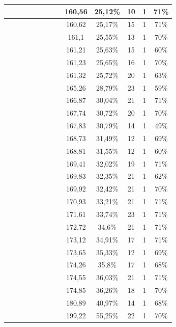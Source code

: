 \begin{center}
\begin{longtable}{|c|c|c|c|c|c|c|c|c|c|c|c|c|}
 \x &  &  &  &  \x &  \x &  \x &  \x & 160,56 & 25,12\% & 10 & 1 & 71\% \\ \hline
 \x &  \x &  \x &  \x &  \x &  \x &  \x &  & 160,62 & 25,17\% & 15 & 1 & 71\% \\ \hline
 \x &  &  \x &  \x &  \x &  \x &  \x &  & 161,1 & 25,55\% & 13 & 1 & 70\% \\ \hline
 \x &  &  &  \x &  \x &  &  &  & 161,21 & 25,63\% & 15 & 1 & 60\% \\ \hline
 \x &  &  \x &  &  \x &  \x &  \x &  \x & 161,23 & 25,65\% & 16 & 1 & 70\% \\ \hline
 \x &  &  \x &  &  \x &  &  \x &  & 161,32 & 25,72\% & 20 & 1 & 63\% \\ \hline
 \x &  &  &  \x &  \x &  &  \x &  \x & 165,26 & 28,79\% & 23 & 1 & 59\% \\ \hline
 \x &  &  &  \x &  \x &  \x &  \x &  & 166,87 & 30,04\% & 21 & 1 & 71\% \\ \hline
 \x &  &  &  \x &  &  \x &  \x &  & 167,74 & 30,72\% & 20 & 1 & 70\% \\ \hline
 \x &  &  &  \x &  &  &  \x &  & 167,83 & 30,79\% & 14 & 1 & 49\% \\ \hline
 \x &  \x &  &  \x &  \x &  \x &  \x &  & 168,73 & 31,49\% & 12 & 1 & 69\% \\ \hline
 \x &  \x &  &  \x &  \x &  &  \x &  & 168,81 & 31,55\% & 12 & 1 & 60\% \\ \hline
 \x &  \x &  \x &  &  \x &  \x &  \x &  \x & 169,41 & 32,02\% & 19 & 1 & 71\% \\ \hline
 \x &  \x &  \x &  \x &  \x &  &  \x &  & 169,83 & 32,35\% & 21 & 1 & 62\% \\ \hline
 \x &  &  &  \x &  \x &  \x &  \x &  \x & 169,92 & 32,42\% & 21 & 1 & 70\% \\ \hline
 \x &  \x &  &  \x &  &  \x &  \x &  & 170,93 & 33,21\% & 21 & 1 & 71\% \\ \hline
 \x &  &  \x &  \x &  \x &  \x &  \x &  \x & 171,61 & 33,74\% & 23 & 1 & 71\% \\ \hline
 \x &  &  \x &  \x &  &  \x &  \x &  & 172,72 & 34,6\% & 21 & 1 & 71\% \\ \hline
 \x &  &  &  &  \x &  \x &  \x &  & 173,12 & 34,91\% & 17 & 1 & 71\% \\ \hline
 \x &  &  \x &  \x &  &  \x &  \x &  \x & 173,65 & 35,33\% & 12 & 1 & 69\% \\ \hline
 \x &  \x &  \x &  \x &  \x &  \x &  \x &  \x & 174,26 & 35,8\% & 17 & 1 & 68\% \\ \hline
 \x &  \x &  &  \x &  &  \x &  \x &  \x & 174,55 & 36,03\% & 21 & 1 & 71\% \\ \hline
 \x &  &  &  \x &  &  \x &  \x &  \x & 174,85 & 36,26\% & 18 & 1 & 70\% \\ \hline
 \x &  \x &  \x &  &  \x &  \x &  \x &  & 180,89 & 40,97\% & 14 & 1 & 68\% \\ \hline
 \x &  \x &  &  &  \x &  \x &  \x &  \x & 199,22 & 55,25\% & 22 & 1 & 70\% \\ \hline
\end{longtable}
\label{table:windProdInputParamsAppendix}
\end{center}
\normalsize

